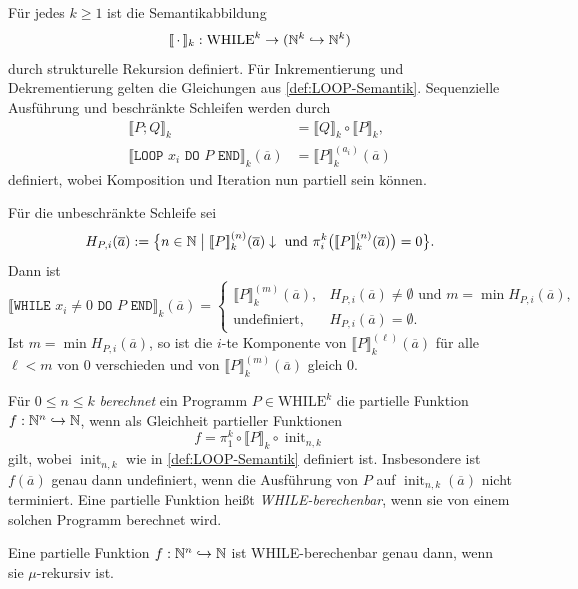 \begin{Def}\label{def:WHILE-Semantik}
  Für jedes $k\geq1$ ist die Semantikabbildung
  \[
    [\![\,\cdot\,]\!]_k:
    \mathrm{WHILE}^k\to(\mathbb{N}^k\hookrightarrow\mathbb{N}^k)
  \]
  durch strukturelle Rekursion definiert. Für Inkrementierung und
  Dekrementierung gelten die Gleichungen aus \autoref{def:LOOP-Semantik}.
  Sequenzielle Ausführung und beschränkte Schleifen werden durch
  \begin{align*}
    \llbracket P;Q\rrbracket_k
      &=\llbracket Q\rrbracket_k\circ\llbracket P\rrbracket_k,\\
    \llbracket \texttt{LOOP }x_i\texttt{ DO }P\texttt{ END}\rrbracket_k
      (\overline{a})
      &=\llbracket P\rrbracket_k^{(a_i)}(\overline{a})
  \end{align*}
  definiert, wobei Komposition und Iteration nun partiell sein können.

  Für die unbeschränkte Schleife sei
  \[
    H_{P,i}(\overline{a})
    :=\bigl\{n\in\mathbb{N}\bigm|
      [\![ P]\!]_k^{(n)}(\overline{a})\downarrow
      \text{ und }
      \pi_i^k\bigl([\![ P]\!]_k^{(n)}(\overline{a})\bigr)=0
    \bigr\}.
  \]
  Dann ist
  \[
    \llbracket \texttt{WHILE }x_i\ne0\texttt{ DO }P\texttt{ END}
    \rrbracket_k(\overline{a}) =
    \begin{cases}
      \llbracket P\rrbracket_k^{(m)}(\overline{a}),
        & H_{P,i}(\overline{a})\ne\emptyset
          \text{ und }m=\min H_{P,i}(\overline{a}),\\
      \text{undefiniert}, & H_{P,i}(\overline{a})=\emptyset.
    \end{cases}
  \]
  Ist $m=\min H_{P,i}(\overline{a})$, so ist die $i$-te Komponente von
  $\llbracket P\rrbracket_k^{(\ell)}(\overline{a})$ für alle $\ell<m$ von
  $0$ verschieden und von
  $\llbracket P\rrbracket_k^{(m)}(\overline{a})$ gleich $0$.

  Für $0\leq n\leq k$ \emph{berechnet} ein Programm
  $P\in\mathrm{WHILE}^k$ die partielle Funktion
  $f:\mathbb{N}^n\hookrightarrow\mathbb{N}$, wenn als Gleichheit partieller Funktionen
  \[
    f=\pi_1^k\circ\llbracket P\rrbracket_k
      \circ\operatorname{init}_{n,k}
  \]
  gilt, wobei $\operatorname{init}_{n,k}$ wie in
  \autoref{def:LOOP-Semantik} definiert ist. Insbesondere ist
  $f(\overline{a})$ genau dann undefiniert, wenn die Ausführung von $P$ auf
  $\operatorname{init}_{n,k}(\overline{a})$ nicht terminiert.
  Eine partielle Funktion heißt \emph{WHILE-berechenbar}, wenn sie von einem
  solchen Programm berechnet wird.
\end{Def}
\begin{Satz}\label{satz:while-murec}
  Eine partielle Funktion $f : \mathbb{N}^n \hookrightarrow \mathbb{N}$ ist
  WHILE-berechenbar genau dann,
  wenn sie $\mu$-rekursiv ist.
\end{Satz}

